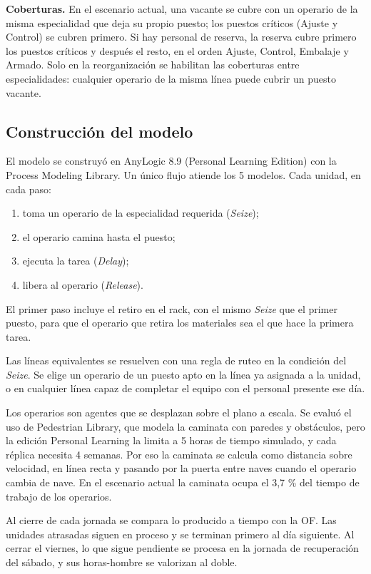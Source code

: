 \documentclass[11pt,a4paper]{article}
\begin{document}
\textbf{Coberturas.} En el escenario actual, una vacante se cubre con un operario de la misma especialidad que deja su propio puesto; los puestos críticos (Ajuste y Control) se cubren primero. Si hay personal de reserva, la reserva cubre primero los puestos críticos y después el resto, en el orden Ajuste, Control, Embalaje y Armado. Solo en la reorganización se habilitan las coberturas entre especialidades: cualquier operario de la misma línea puede cubrir un puesto vacante.

\subsection{Construcción del modelo}

El modelo se construyó en AnyLogic 8.9 (Personal Learning Edition) con la Process Modeling Library. Un único flujo atiende los 5 modelos. Cada unidad, en cada paso:

\begin{enumerate}
\item toma un operario de la especialidad requerida (\emph{Seize});
\item el operario camina hasta el puesto;
\item ejecuta la tarea (\emph{Delay});
\item libera al operario (\emph{Release}).
\end{enumerate}

El primer paso incluye el retiro en el rack, con el mismo \emph{Seize} que el primer puesto, para que el operario que retira los materiales sea el que hace la primera tarea.

Las líneas equivalentes se resuelven con una regla de ruteo en la condición del \emph{Seize}. Se elige un operario de un puesto apto en la línea ya asignada a la unidad, o en cualquier línea capaz de completar el equipo con el personal presente ese día.

Los operarios son agentes que se desplazan sobre el plano a escala. Se evaluó el uso de Pedestrian Library, que modela la caminata con paredes y obstáculos, pero la edición Personal Learning la limita a 5 horas de tiempo simulado, y cada réplica necesita 4 semanas. Por eso la caminata se calcula como distancia sobre velocidad, en línea recta y pasando por la puerta entre naves cuando el operario cambia de nave. En el escenario actual la caminata ocupa el 3,7 \% del tiempo de trabajo de los operarios.

Al cierre de cada jornada se compara lo producido a tiempo con la OF. Las unidades atrasadas siguen en proceso y se terminan primero al día siguiente. Al cerrar el viernes, lo que sigue pendiente se procesa en la jornada de recuperación del sábado, y sus horas-hombre se valorizan al doble.
\end{document}
